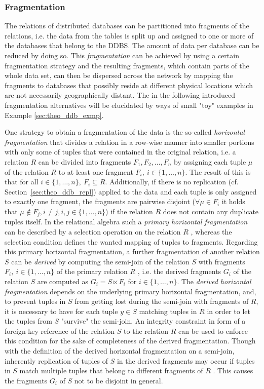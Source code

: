 \subsubsection{Fragmentation}
\label{sec:theo_ddb_frag}
The relations of distributed databases can be partitioned into fragments of the relations, i.e. the data from the tables is split up and assigned to one or 
more of the databases that belong to the DDBS. The amount of data per database can be reduced by doing so. This \emph{fragmentation} can be achieved by using
a certain fragmentation strategy and the resulting fragments, which contain parts of the whole data set, can then be dispersed across the network by mapping
the fragments to databases that possibly reside at different physical locations which are not necessarily geographically distant. The in the following 
introduced fragmentation alternatives will be elucidated by ways of small "toy" examples in Example \ref{sec:theo_ddb_exmp}.

One strategy to obtain a fragmentation of the data is the so-called \emph{horizontal fragmentation} \cite[p.~105]{Ozsu1991} that divides a relation in a 
row-wise manner into smaller portions with only some of tuples that were contained in the original relation, i.e. a relation $R$ can be divided into fragments
$F_1, F_2,\dots, F_n$ by assigning each tuple $\mu$ of the relation $R$ to at least one fragment $F_i,~i\in\{1,\dots,n\}$. The result of this is that for all 
$i\in\{1,\dots,n\},~F_i \subseteq R$. Additionally, if there is no replication (cf. Section~\ref{sec:theo_ddb_repl}) applied to the data and each tuple is only
assigned to exactly one fragment, the fragments are pairwise disjoint ($\forall \mu \in F_i$ it holds that $\mu \notin F_j, i\neq j, i,j\in\{1,\dots,n\}$) 
if the relation $R$ does not contain any duplicate tuples itself. In the relational algebra such a \emph{primary horizontal fragmentation} can be described by
a selection operation on the relation $R$ \cite[p.~109]{Ozsu1991}, whereas the selection condition defines the wanted mapping of tuples to fragments. 
Regarding this primary horizontal fragmentation, a further fragmentation of another relation $S$ can be \emph{derived} by computing the semi-join of the
relation $S$ with fragments $F_i,~i\in\{1,\dots,n\}$ of the primary relation $R$ \cite[p.~116f.]{Ozsu1991}, i.e. the derived fragments $G_i$ of the relation
$S$ are computed as $G_i=S \ltimes F_i$ for $i\in\{1,\dots,n\}$. The \emph{derived horizontal fragmentation} depends on the underlying primary horizontal
fragmentation, and, to prevent tuples in $S$ from getting lost during the semi-join with fragments of $R$, it is necessary to have for each tuple $y\in S$ 
matching tuples in $R$ in order to let the tuples from $S$ "survive" the semi-join. An integrity constraint in form of a foreign key reference of the relation
$S$ to the relation $R$ can be used to enforce this condition for the sake of completeness of the derived fragmentation. Though with the definition of the 
derived horizontal fragmentation on a semi-join, inherently replication of tuples of $S$ in the derived fragments may occur if tuples in $S$ match multiple
tuples that belong to different fragments of $R$ \cite[p.~121]{Ozsu1991}. This causes the fragments $G_i$ of $S$ not to be disjoint in general.


